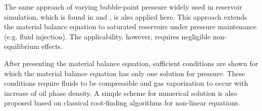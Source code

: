 \documentclass[final,authoryear,5p,twocolumn,10pt]{elsarticle}
\begin{document}

 The same approach of varying bubble-point pressure widely used in reservoir simulation, which is found in \cite{aziz1979petroleum} and \cite{ertekin2001basic}, is also applied here. This approach extends the material balance equation to saturated reservoirs under pressure maintenance (e.g. fluid injection). The applicability, however, requires negligible non-equilibrium effects.


After presenting the material balance equation, sufficient conditions are shown for which the material balance equation has only one solution for pressure. These conditions require fluids to be compressible and gas vaporization to occur with increase of oil phase density. A simple scheme for numerical solution is also proposed based on classical root-finding algorithms for non-linear equations.
\end{document}
